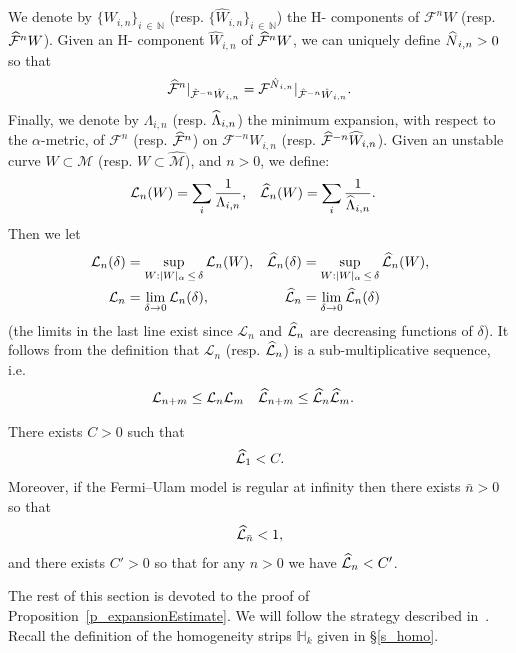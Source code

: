 \documentclass[10pt]{amsart}
\theoremstyle{definition}\newtheorem{defi}[theo]{Definition}\newtheorem{rema}[theo]{Remark}\newtheorem{exam}[theo]{Example}\newtheorem{exem}[theo]{Example}\newtheorem{nota}[theo]{Notation}
\newcommand{\bN}{\mathbb{N}}
\newcommand{\homo}{\mathbb{H}}
\newcommand{\cm}{\mathcal{F}}
\newcommand{\csp}{\mathcal{M}}
\newcommand{\cmp}{\hat\cm}
\newcommand{\cspi}{\widehat{\csp}}
\newcommand{\Hcomp}{H-\hskip0pt component}
\newcommand{\Hcomps}{H-\hskip0pt components}
\newcommand{\adm}{_{\alpha^{+}}}
\newcommand{\admName}{\alpha^{+}}
\newcommand{\Np}{\hat N}
\newcommand{\cL}{\mathcal{L}}
\renewcommand{\admName}{\alpha}
\renewcommand{\adm}{_{\alpha}}
\let\oldhat\hat
\renewcommand*{\hat}[1]{\mathchoice{\widehat{#1}}{\widehat{#1}}{\oldhat{#1}}{\oldhat{#1}}}
\begin{document}
We denote by $\{W_{i,n}\}_{i\,\in\,\bN}$ (resp. $\{\widehat W_{i,n}\}_{i\,\in\,\bN}$) the \Hcomps{} of $\cm^n W$ (resp. $\cmp^n W$). Given an \Hcomp{} $\widehat W_{i,n}$ of $\cmp^n W$, we can uniquely define $\Np_{i,n} > 0$ so that
\begin{align*}
\cmp^n|_{\cmp^{-n} \hat W_{i,n}} = \cm^{\Np_{i,n}}|_{\cmp^{-n} \hat W_{i,n}}.
\end{align*}
Finally, we denote by $\Lambda_{i,n}$ (resp. $\hat\Lambda_{i,n}$) the minimum expansion, with respect to the $\admName$-metric, of $\cm^n$ (resp. $\cmp^n$) on $\cm^{-n} W_{i,n}$ (resp. $\cmp^{-n}\widehat W_{i,n}$). Given an unstable curve $W\subset \csp$ (resp. $W\subset\cspi$), and $n > 0$, we define:
\begin{align*}
\cL_{n}(W) &= \sum_{i}\frac1{\Lambda_{i,n}},&
\hat \cL_{n}(W) &= \sum_{i}\frac1{\hat\Lambda_{i,n}}.
\end{align*}
Then we let
\begin{align*}
\cL_{n}(\delta) &= \sup_{W:|W|\adm\,\le\,\delta} \cL_{n}(W),&
\hat \cL_{n}(\delta) &= \sup_{W:|W|\adm\,\le\,\delta} \hat \cL_{n}(W),\\
\cL_{n} &= \lim_{\delta\to 0}\cL_{n}(\delta),&
\hat \cL_{n} &= \lim_{\delta\to 0} \hat \cL_{n}(\delta)
\end{align*}
(the limits in the last line exist since $\cL_n$ and $\hat\cL_n$ are decreasing functions of $\delta$). It follows from the definition that $\cL_{n}$ (resp. $\hat\cL_{n}$) is a sub-multiplicative sequence, i.e.
\begin{align}\label{eq:cL-submultiplicative}
\cL_{n+m}&\le\cL_{n}\cL_{m} & \hat\cL_{n+m}&\le\hat\cL_{n}\hat\cL_{m}.
\end{align}

\begin{prop}\label{p_expansionEstimate}
There exists $C > 0$ such that
\begin{align}\label{e_expansionEstimate-trivial}
\hat \cL_{1} < C.
\end{align}
Moreover, if the Fermi--Ulam model is regular at infinity then there exists $\bar n > 0$ so that
\begin{align}\label{e_expansionEstimate}
\hat \cL_{\bar n} < 1,
\end{align}
and there exists $C' > 0$ so that for any $n > 0$ we have $\hat \cL_{n} < C'$.
\end{prop}

The rest of this section is devoted to the proof of Proposition~\ref{p_expansionEstimate}. We will follow the strategy described in~\cite{jmogy}. Recall the definition of the homogeneity strips $\homo_k$ given in \S\ref{s_homo}.
\end{document}
